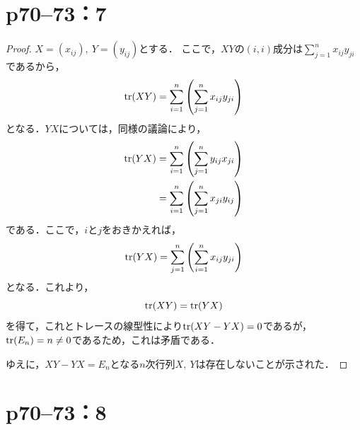 \documentclass[a4paper,10pt,fleqn]{ltjsarticle}
\begin{document}
\newpage

\section*{p70--73：7}

\begin{tleftbar}
    \begin{proof}
        $X=(x_{ij}),~Y=(y_{ij})$とする．
        ここで，$XY$の$(i,i)$成分は$\sum_{j=1}^{n} x_{ij} y_{ji}$であるから，
        \begin{equation*}
            \tr (XY)  =  \sum_{i=1}^{n} \left( \sum_{j=1}^{n} x_{ij} y_{ji} \right)
        \end{equation*}
        となる．$YX$については，同様の議論により，
        \begin{align*}
            \tr  (YX) & =  \sum_{i=1}^{n}\left( \sum_{j=1}^{n}  y_{ij} x_{ji} \right)  \\
                      & =  \sum_{i=1}^{n} \left( \sum_{j=1}^{n}  x_{ji} y_{ij} \right)
        \end{align*}
        である．ここで，$i$と$j$をおきかえれば，
        \begin{equation}
            \tr  (YX) = \sum_{j=1}^{n} \left( \sum_{i=1}^{n}  x_{ij} y_{ji} \right)
        \end{equation}
        となる．これより，
        \begin{equation}
            \tr (XY) = \tr  (YX)
        \end{equation}
        を得て，これとトレースの線型性により$\tr (XY-YX) =0$であるが，$\tr  (E_n) =n \neq 0$であるため，これは矛盾である．

        ゆえに，$XY-YX=E_n$となる$n$次行列$X,~Y$は存在しないことが示された．
    \end{proof}
\end{tleftbar}

\newpage

\section*{p70--73：8}
\end{document}

